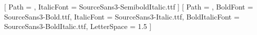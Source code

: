 \usepackage{enumitem}



\usepackage{siunitx}


\makeatletter

\newfontfamily{}[
  Path = \chrisdocfontpath,
  ItalicFont = SourceSans3-SemiboldItalic.ttf
]
\newfontfamily{}[
  Path = \chrisdocfontpath,
  BoldFont = SourceSans3-Bold.ttf,
  ItalicFont = SourceSans3-Italic.ttf,
  BoldItalicFont = SourceSans3-BoldItalic.ttf,
  LetterSpace = 1.5
]

\patchcmd{\@maketitle}{\begin{center}}{\begin{center}\vspace*{10em}}{}{}


\patchcmd{\@maketitle}{\@title}{{\TitleSans\fontsize{24}{6}\selectfont \@title}}{}{}

\providecommand{\subtitle}[1]{%
  \apptocmd{\@title}{%
    \par\vspace{0.15em}%
    {\SubtitleFont\LARGE #1}%
    \par\vspace{0.35em}%
  }{}{}%
}

\makeatother


\makeatletter
\renewenvironment{abstract}{%
  \par\vspace{0.25\baselineskip}%
  \begingroup\setlength{\parindent}{0pt}\noindent\ignorespaces
}{%
  \par\endgroup\vspace{0.5\baselineskip}%
  \thispagestyle{cover}%
  \clearpage
  \pagenumbering{arabic}\setcounter{page}{1}%
}
\makeatother


\makeatletter

